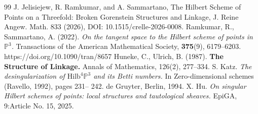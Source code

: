 \documentclass{amsart}[10pt]
\theoremstyle{plain}
\theoremstyle{definition}
\newtheorem{lemma}[theorem]{Lemma}
\newcommand{\Hilb}{\mathrm{Hilb}}
\begin{document}

\begin{thebibliography}{99}
 J. Jelisiejew, R. Ramkumar, and A. Sammartano, The Hilbert Scheme of Points on a Threefold: Broken Gorenstein Structures and Linkage, J. Reine Angew. Math. 833 (2026), DOI: 10.1515/crelle-2026-0008. 
Ramkumar, R., Sammartano, A. (2022). \textit{On the tangent space to the Hilbert scheme of points in $\mathbb{P}^3$.} Transactions of the American Mathematical Society, \textbf{375}(9), 6179–6203. https://doi.org/10.1090/tran/8657
 Huneke, C., Ulrich, B. (1987). \textbf{The Structure of Linkage.} Annals of Mathematics, 126(2), 277–334.
  S. Katz. \textit{The desingularization of $\Hilb^4\mathbb{P}^3$ and its Betti numbers.} In Zero-dimensional schemes (Ravello, 1992), pages 231– 242. de Gruyter, Berlin, 1994.
  X. Hu. \textit{On singular Hilbert schemes of points: local structures and tautological sheaves.} EpiGA, 9:Article No. 15, 2025.
\end{thebibliography}
\end{document}
